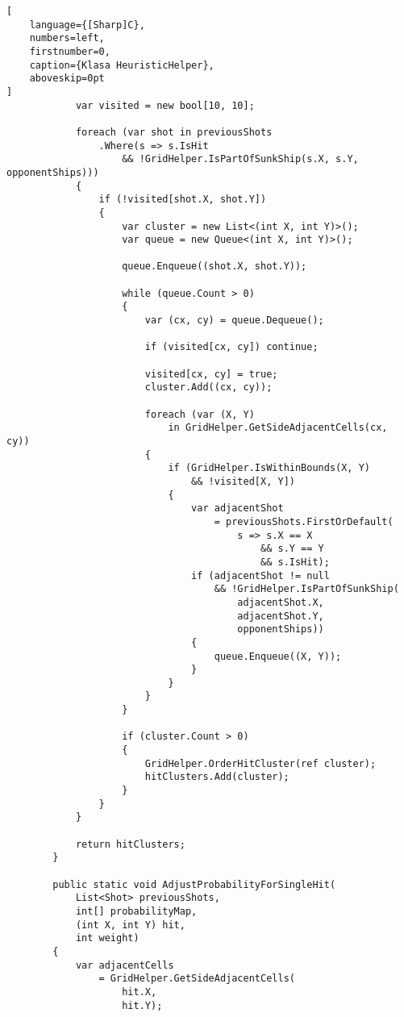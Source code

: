 \begin{addmargin}[0mm]{0mm}
\begin{lstlisting}[
    language={[Sharp]C},
    numbers=left,
    firstnumber=0,
    caption={Klasa HeuristicHelper},
    aboveskip=0pt
]
            var visited = new bool[10, 10];

            foreach (var shot in previousShots
                .Where(s => s.IsHit 
                    && !GridHelper.IsPartOfSunkShip(s.X, s.Y, opponentShips)))
            {
                if (!visited[shot.X, shot.Y])
                {
                    var cluster = new List<(int X, int Y)>();
                    var queue = new Queue<(int X, int Y)>();

                    queue.Enqueue((shot.X, shot.Y));

                    while (queue.Count > 0)
                    {
                        var (cx, cy) = queue.Dequeue();

                        if (visited[cx, cy]) continue;

                        visited[cx, cy] = true;
                        cluster.Add((cx, cy));

                        foreach (var (X, Y) 
                            in GridHelper.GetSideAdjacentCells(cx, cy))
                        {
                            if (GridHelper.IsWithinBounds(X, Y)
                                && !visited[X, Y])
                            {
                                var adjacentShot
                                    = previousShots.FirstOrDefault(
                                        s => s.X == X
                                            && s.Y == Y
                                            && s.IsHit);
                                if (adjacentShot != null
                                    && !GridHelper.IsPartOfSunkShip(
                                        adjacentShot.X,
                                        adjacentShot.Y,
                                        opponentShips))
                                {
                                    queue.Enqueue((X, Y));
                                }
                            }
                        }
                    }

                    if (cluster.Count > 0)
                    {
                        GridHelper.OrderHitCluster(ref cluster);
                        hitClusters.Add(cluster);
                    }
                }
            }

            return hitClusters;
        }

        public static void AdjustProbabilityForSingleHit(
            List<Shot> previousShots,
            int[] probabilityMap,
            (int X, int Y) hit,
            int weight)
        {
            var adjacentCells
                = GridHelper.GetSideAdjacentCells(
                    hit.X,
                    hit.Y);


\end{lstlisting}
\end{addmargin}
